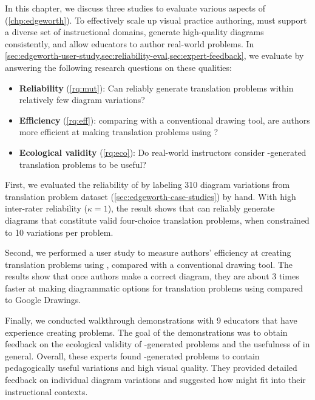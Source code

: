 In this chapter, we discuss three studies to evaluate various aspects of \Edgeworth (\cref{chp:edgeworth}). To effectively scale up visual practice authoring, \Edgeworth must support a diverse set of instructional domains, generate high-quality diagrams consistently, and allow educators to author real-world problems. In \cref{sec:edgeworth-user-study,sec:reliability-eval,sec:expert-feedback}, we evaluate \Edgeworth by answering the following research questions on these qualities:



\begin{itemize}
    \item\textbf{Reliability} (\ref{rq:mut}): Can \Edgeworth reliably generate translation problems within relatively few diagram variations?
    \item\textbf{Efficiency} (\ref{rq:eff}): comparing with a conventional drawing tool, are authors more efficient at making translation problems using \Edgeworth? 
    \item\textbf{Ecological validity} (\ref{rq:eco}): Do real-world instructors consider \Edgeworth-generated translation problems to be useful? 
\end{itemize}

First, we evaluated the reliability of \Edgeworth by labeling 310 diagram variations from translation problem dataset (\cref{sec:edgeworth-case-studies}) by hand. With high inter-rater reliability ($\kappa=1$), the result shows that \Edgeworth can reliably generate diagrams that constitute valid four-choice translation problems, when constrained to 10 variations per problem.

Second, we performed a user study to measure authors' efficiency at creating translation problems using \Edgeworth, compared with a conventional drawing tool. The results show that once authors make a correct diagram, they are about 3 times faster at making diagrammatic options for translation problems using \Edgeworth compared to Google Drawings. 

Finally, we conducted walkthrough demonstrations with 9 educators that have experience creating problems. The goal of the demonstrations was to obtain feedback on the ecological validity of \Edgeworth-generated problems and the usefulness of \Edgeworth in general. Overall, these experts found \Edgeworth-generated problems to contain pedagogically useful variations and high visual quality. They provided detailed feedback on individual diagram variations and suggested how \Edgeworth might fit into their instructional contexts. 

